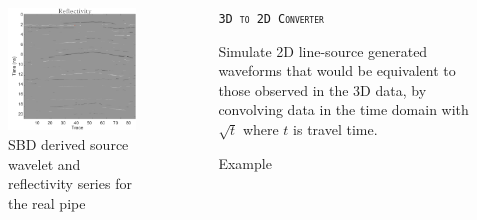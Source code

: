 \documentclass[final]{beamer}
\newlength{\sepwid}
\newlength{\onecolwid}
\newlength{\twocolwid}
\begin{document}
\begin{frame}[t]
\begin{columns}[t]
\begin{column}{\twocolwid}
\begin{columns}[t,totalwidth=\twocolwid]
\begin{column}{\onecolwid}
\begin{block}{}
\begin{figure}
	\includegraphics[width=0.65\linewidth]{SBD_pipe_refl.png}
	\caption{\textrm{SBD derived source wavelet and reflectivity series for the real pipe~\cite{jazayeri2017sparse}}}
\end{figure}
\end{block}



\end{column} %

\end{columns} %

\end{column} %

\begin{column}{\sepwid}\end{column} %

\begin{column}{\onecolwid} %

\begin{block}{\textsc{\texttt{3D to 2D Converter}}}
	
	Simulate 2D line-source generated waveforms that would be equivalent to those observed in the 3D data, by convolving data in the time domain with $\sqrt{t}$ where $t$ is travel time.
	
\end{block}

\vspace{3cm}

\begin{block}{Example}
	

\end{block}
\end{column}
\end{columns}
\end{frame}
\end{document}
